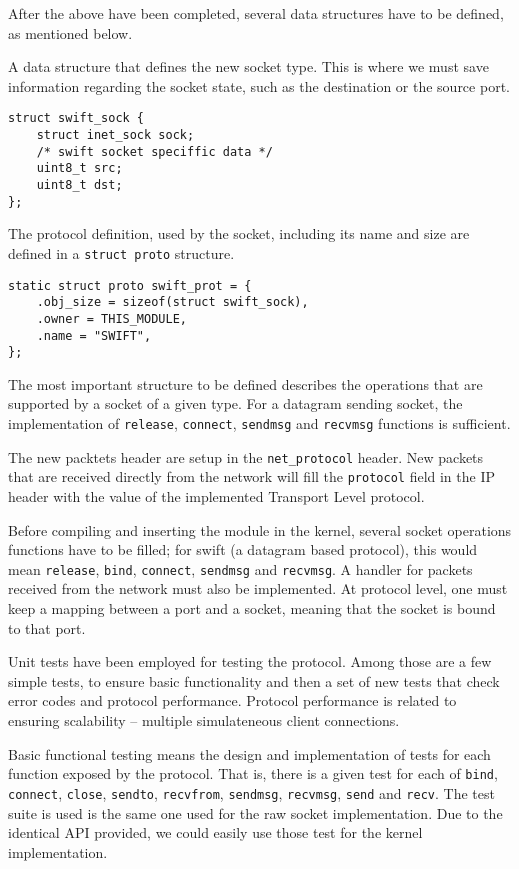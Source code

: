After the above have been completed, several data structures have to be
defined, as mentioned below.

A data structure that defines the new socket type. This is where we must save
information regarding the socket state, such as the destination or the source
port.
\begin{verbatim}
struct swift_sock {
    struct inet_sock sock;
    /* swift socket speciffic data */
    uint8_t src;
    uint8_t dst;
};
\end{verbatim}

The protocol definition, used by the socket, including its name and size are
defined in a \texttt{struct proto} structure.
\begin{verbatim}
static struct proto swift_prot = {
    .obj_size = sizeof(struct swift_sock),
    .owner = THIS_MODULE,
    .name = "SWIFT",
};
\end{verbatim}

The most important structure to be defined describes the operations that are
supported by a socket of a given type. For a datagram sending socket, the
implementation of \texttt{release}, \texttt{connect}, \texttt{sendmsg} and
\texttt{recvmsg} functions is sufficient.

The new packtets header are setup in the \texttt{net\_protocol} header. New
packets that are received directly from the network will fill the
\texttt{protocol} field in the IP header with the value of the implemented
Transport Level protocol.

Before compiling and inserting the module in the kernel, several socket
operations functions have to be filled; for swift (a datagram based protocol),
this would mean \texttt{release}, \texttt{bind}, \texttt{connect},
\texttt{sendmsg} and \texttt{recvmsg}. A handler for packets received from the
network must also be implemented. At protocol level, one must keep a mapping
between a port and a socket, meaning that the socket is bound to that port.

Unit tests have been employed for testing the protocol. Among those are a few
simple tests, to ensure basic functionality and then a set of new tests that
check error codes and protocol performance. Protocol performance is related to
ensuring scalability -- multiple simulateneous client connections.

Basic functional testing means the design and implementation of tests for each
function exposed by the protocol. That is, there is a given test for each of
\texttt{bind}, \texttt{connect}, \texttt{close}, \texttt{sendto},
\texttt{recvfrom}, \texttt{sendmsg}, \texttt{recvmsg}, \texttt{send} and
\texttt{recv}. The test suite is used is the same one used for the raw
socket implementation. Due to the identical API provided, we could easily use
those test for the kernel implementation.
